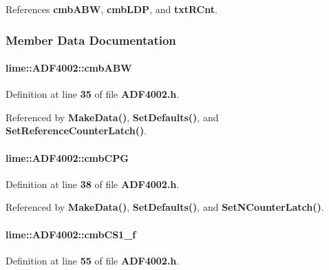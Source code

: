References {\bf cmb\+A\+BW}, {\bf cmb\+L\+DP}, and {\bf txt\+R\+Cnt}.



\subsubsection{Member Data Documentation}
\paragraph[{cmb\+A\+BW}]{ lime\+::\+A\+D\+F4002\+::cmb\+A\+BW}\label{classlime_1_1ADF4002_a110731b3fdf6f96f973da0f9f9bc2835}


Definition at line {\bf 35} of file {\bf A\+D\+F4002.\+h}.



Referenced by {\bf Make\+Data()}, {\bf Set\+Defaults()}, and {\bf Set\+Reference\+Counter\+Latch()}.

\paragraph[{cmb\+C\+PG}]{ lime\+::\+A\+D\+F4002\+::cmb\+C\+PG}\label{classlime_1_1ADF4002_a83e3f9452d8c1e1761c5783d169f0d4e}


Definition at line {\bf 38} of file {\bf A\+D\+F4002.\+h}.



Referenced by {\bf Make\+Data()}, {\bf Set\+Defaults()}, and {\bf Set\+N\+Counter\+Latch()}.

\paragraph[{cmb\+C\+S1\+\_\+f}]{ lime\+::\+A\+D\+F4002\+::cmb\+C\+S1\+\_\+f}\label{classlime_1_1ADF4002_a56981c098e0c4687793e11bf5405bd67}


Definition at line {\bf 55} of file {\bf A\+D\+F4002.\+h}.



